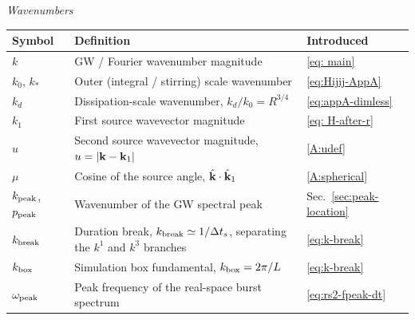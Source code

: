 \documentclass[10pt,prd,aps,nobibnotes,superscriptaddress,preprintnumbers,notitlepage]{revtex4-1}
\newcommand{\kb}{{\bf k}}
\begin{document}
\medskip\noindent \emph{Wavenumbers}\par\nobreak\smallskip
\noindent\begin{tabular}{@{}p{} p{} p{}@{}}
\hline\hline
Symbol & Definition & Introduced \\
\hline
$k$                   & GW / Fourier wavenumber magnitude & \eqref{eq: main}\\
$k_0$, $k_\ast$       & Outer (integral / stirring) scale wavenumber & \eqref{eq:Hijij-AppA}\\
$k_d$                 & Dissipation-scale wavenumber, $k_d/k_0=R^{3/4}$ & \eqref{eq:appA-dimless}\\
$k_1$                 & First source wavevector magnitude & \eqref{eq: H-after-r}\\
$u$                   & Second source wavevector magnitude, $u=|\kb-\kb_1|$ & \eqref{A:udef}\\
$\mu$                 & Cosine of the source angle, $\hat\kb\cdot\hat\kb_1$ & \eqref{A:spherical}\\
$k_{\rm peak}$, $p_{\rm peak}$ & Wavenumber of the GW spectral peak & Sec.~\ref{sec:peak-location}\\
$k_{\rm break}$      & Duration break, $k_{\rm break}\simeq1/\Delta t_s$, separating the $k^1$ and $k^3$ branches & \eqref{eq:k-break}\\
$k_{\rm box}$        & Simulation box fundamental, $k_{\rm box}=2\pi/L$ & \eqref{eq:k-break}\\
$\omega_{\rm peak}$   & Peak frequency of the real-space burst spectrum & \eqref{eq:rs2-fpeak-dt}\\
\hline\hline
\end{tabular}\par
\end{document}
